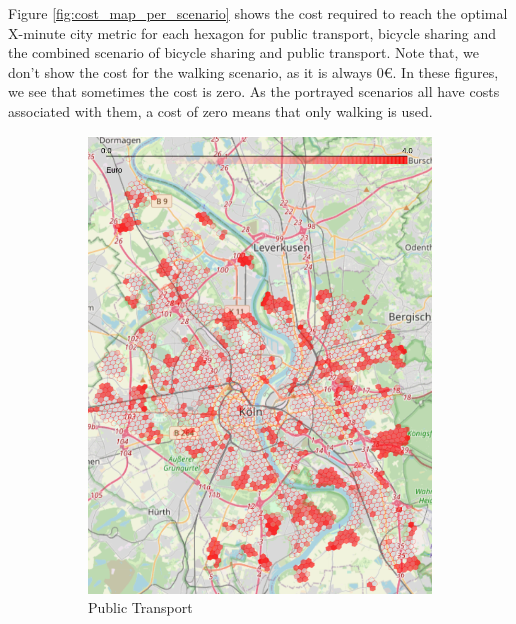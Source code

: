Figure \ref{fig:cost_map_per_scenario} shows the cost required to reach the optimal X-minute city metric for each hexagon for public transport, bicycle sharing and the combined scenario of bicycle sharing and public transport.
Note that, we don't show the cost for the walking scenario, as it is always 0€.
In these figures, we see that sometimes the cost is zero.
As the portrayed scenarios all have costs associated with them, a cost of zero means that only walking is used.
\begin{figure}
     \centering
     \begin{subfigure}[b]{0.3\textwidth}
         \centering
         \includegraphics[width=\textwidth]{Figures/results/cost/public_transport_cost_map}
         \caption{Public Transport}
         \label{fig:public_transport_cost_map}
     \end{subfigure}
     \hfill
     \begin{subfigure}[b]{0.3\textwidth}
         \centering

\end{subfigure}
\end{figure}
